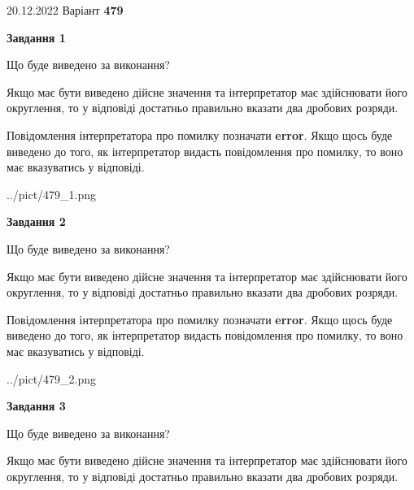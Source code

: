 \documentclass[12pt, ukrainian]{article}
\begin{document}
{20.12.2022 Варіант \No \textbf { 479 }\par}
{
\begin {Large}

{\begin {center}\textbf{Завдання 1}\end {center}}\par
Що буде виведено за виконання? \par

Якщо має бути виведено дійсне значення та інтерпретатор має здійснювати його округлення, 
то у відповіді достатньо правильно вказати два дробових розряди.

Повідомлення інтерпретатора про помилку позначати \textbf{error}.
Якщо щось буде виведено до того, як інтерпретатор видасть повідомлення про помилку, 
то воно має вказуватись у відповіді. \par

\begin{center}
	{../pict/479_1.png}
\end{center}
\newpage

{\begin {center}\textbf{Завдання 2}\end {center}}\par
Що буде виведено за виконання? \par

Якщо має бути виведено дійсне значення та інтерпретатор має здійснювати його округлення, 
то у відповіді достатньо правильно вказати два дробових розряди.

Повідомлення інтерпретатора про помилку позначати \textbf{error}.
Якщо щось буде виведено до того, як інтерпретатор видасть повідомлення про помилку, 
то воно має вказуватись у відповіді. \par

\begin{center}
	{../pict/479_2.png}
\end{center}
\newpage

{\begin {center}\textbf{Завдання 3}\end {center}}\par
Що буде виведено за виконання? \par

Якщо має бути виведено дійсне значення та інтерпретатор має здійснювати його округлення, 
то у відповіді достатньо правильно вказати два дробових розряди.


\end{Large}}
\end{document}
